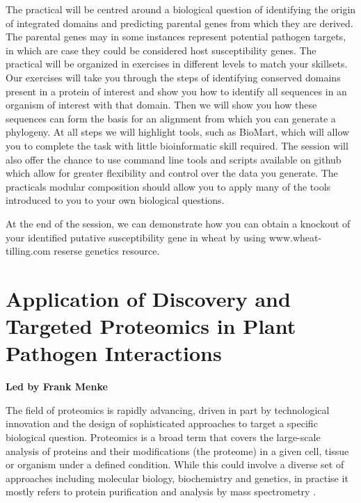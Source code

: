 \documentclass[12pt,]{book}
\theoremstyle{definition}
\theoremstyle{definition}
\theoremstyle{remark}
\begin{document}
The practical will be centred around a biological question of
identifying the origin of integrated domains and predicting parental
genes from which they are derived. The parental genes may in some
instances represent potential pathogen targets, in which are case they
could be considered host susceptibility genes. The practical will be
organized in exercises in different levels to match your skillsets. Our
exercises will take you through the steps of identifying conserved
domains present in a protein of interest and show you how to identify
all sequences in an organism of interest with that domain. Then we will
show you how these sequences can form the basis for an alignment from
which you can generate a phylogeny. At all steps we will highlight
tools, such as BioMart, which will allow you to complete the task with
little bioinformatic skill required. The session will also offer the
chance to use command line tools and scripts available on github which
allow for greater flexibility and control over the data you generate.
The practicals modular composition should allow you to apply many of the
tools introduced to you to your own biological questions.

At the end of the session, we can demonstrate how you can obtain a
knockout of your identified putative susceptibility gene in wheat by
using www.wheat-tilling.com reserse genetics resource.

\chapter*{Application of Discovery and Targeted Proteomics in Plant
Pathogen
Interactions}\label{application-of-discovery-and-targeted-proteomics-in-plant-pathogen-interactions}

\textbf{Led by Frank Menke}

The field of proteomics is rapidly advancing, driven in part by
technological innovation and the design of sophisticated approaches to
target a specific biological question. Proteomics is a broad term that
covers the large-scale analysis of proteins and their modifications (the
proteome) in a given cell, tissue or organism under a defined condition.
While this could involve a diverse set of approaches including molecular
biology, biochemistry and genetics, in practise it mostly refers to
protein purification and analysis by mass spectrometry
\citep{Aebersold:2016kt}.
\end{document}
